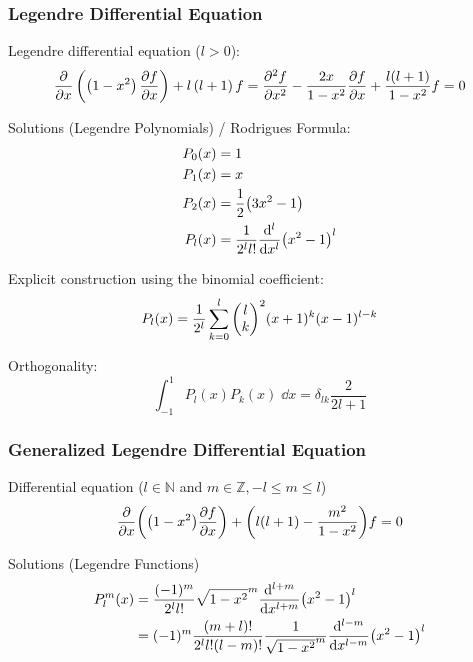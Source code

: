 		\subsubsection{Legendre Differential Equation}
			\noindent
			Legendre differential equation ($l>0$):
			\begin{equation}
				\pdv{x}\left(\left(1-x^2\right)\pdv{f}{x}\right)+l\left(l+1\right)f
				= \frac{\partial^2 f}{\partial x^2} - \frac{2x}{1-x^2}\pdv{f}{x} + \frac{l(l+1)}{1-x^2}f = 0
			\end{equation}

			\noindent
			Solutions (Legendre Polynomials) / Rodrigues Formula:
			\begin{equation} \label{Eq:LegendrePolynomials}
				\begin{aligned}
					P_0(x) &= 1 \\
					P_1(x) &= x \\
					P_2(x) &= \frac{1}{2}\qty(3x^2-1) \\
					P_l(x) &= \frac{1}{2^l l!}\dv[l]{x}\qty(x^2-1)^l \\
				\end{aligned}
			\end{equation}

			\noindent
			Explicit construction using the binomial coefficient:
			\begin{equation}
				P_l(x)=\frac{1}{2^l} \sum_{k=0}^{l}\binomkoeff{l}{k}^2(x+1)^k(x-1)^{l-k}
			\end{equation}

			\noindent
			Orthogonality:
			\begin{equation}
				\int_{-1}^1 P_l(x) P_k(x)\;\dd x = \delta_{lk} \frac{2}{2l+1}
			\end{equation}

		\subsubsection{Generalized Legendre Differential Equation}
			\noindent
			Differential equation ($l\in\mathbb{N}$ and $m\in\mathbb{Z}, -l\le m\le l$)
			\begin{equation}
				\pdv{x}\qty(\qty(1-x^2)\pdv{f}{x})+\qty(l\qty(l+1)-\frac{m^2}{1-x^2})f= 0
			\end{equation}

			\noindent
			Solutions (Legendre Functions)
			\begin{equation}
				\begin{aligned}
					P_l^m(x) &= \frac{(-1)^m}{2^l l!}\sqrt{1-x^2}^m
					\dv[l+m]{x}\qty(x^2-1)^l \\
					&= (-1)^m \frac{(m+l)!}{2^l l! (l-m)!}\frac{1}{\sqrt{1-x^2}^m}
					\dv[l-m]{x}\qty(x^2-1)^l \\
				\end{aligned}
			\end{equation}

